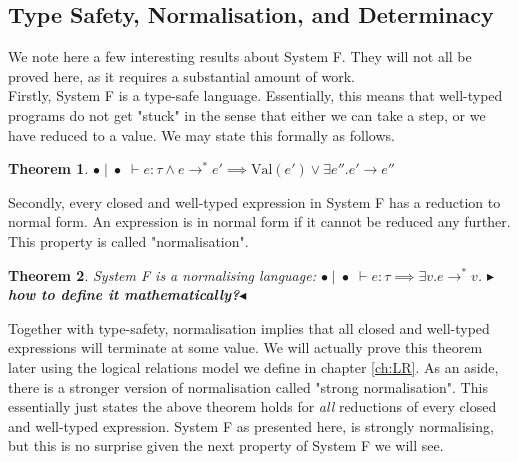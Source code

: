 \documentclass[a4paper, 11pt]{report}
\newtheorem{theorem}{Theorem}
\theoremstyle{definition}
\newcommand{\expr}{e}
\newcommand{\val}{v}
\newcommand{\typ}{\tau}
\newcommand{\emptenv}{\bullet}
\newcommand{\empvenv}{\bullet}
\newcommand{\jdg}[4]{#1 \; | \; #2 \; \vdash #3 : #4}
\newcommand{\step}{\rightarrow}
\newcommand{\stepS}{\rightarrow^*}
\newcommand{\Val}[1]{\mathrm{Val}(#1)}
\newcommand{\todo}[1]{{\color[rgb]{.5,0,0}\textbf{$\blacktriangleright$#1$\blacktriangleleft$}}}
\begin{document}
\subsection{Type Safety, Normalisation, and Determinacy}
We note here a few interesting results about System F. They will not all be proved here, as it requires a substantial amount of work.\\
Firstly, System F is a type-safe language. Essentially, this means that well-typed programs do not get "stuck" in the sense that either we can take a step, or we have reduced to a value. We may state this formally as follows.
\begin{theorem}\label{thm:typesafety}
  $\jdg{\emptenv}{\empvenv}{\expr}{\typ} \land \expr \stepS \expr' \implies \Val{\expr'} \lor \exists \expr'' . \expr' \step \expr''$
\end{theorem}
Secondly, every closed and well-typed expression in System F has a reduction to normal form. An expression is in normal form if it cannot be reduced any further. This property is called "normalisation".
\begin{theorem}\label{thm:norm}
  System F is a normalising language: $\jdg{\emptenv}{\empvenv}{\expr}{\typ} \implies \exists \val . \expr \stepS \val$. \todo{how to define it mathematically?}
\end{theorem}
Together with type-safety, normalisation implies that all closed and well-typed expressions will terminate at some value. We will actually prove this theorem later using the logical relations model we define in chapter \ref{ch:LR}. As an aside, there is a stronger version of normalisation called "strong normalisation". This essentially just states the above theorem holds for \textit{all} reductions of every closed and well-typed expression. System F as presented here, is strongly normalising, but this is no surprise given the next property of System F we will see.

\end{document}
